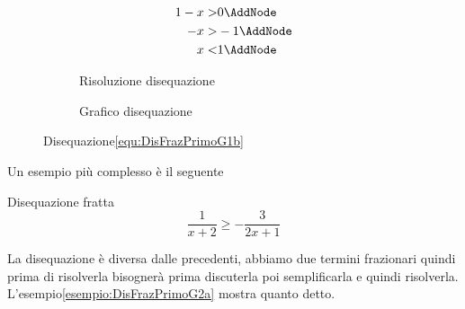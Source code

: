 \begin{figure}
	\centering
	\begin{subfigure}[]{\linewidth}
		\begin{NodesList}
			\centering
			\begin{align*}
				1-x>& 0\AddNode\\
				-x>&-1\AddNode\\
				x<&1\AddNode
			\end{align*}
			\LinkNodes[margin=6cm]{}%
			\LinkNodes[margin=6cm]{}%
		\end{NodesList}
		\caption{Risoluzione disequazione}
		\label{svo:DisFrazPrimoGìb}
	\end{subfigure}%
	\qquad
	\begin{subfigure}[]{\linewidth}
		\centering
		\caption{Grafico disequazione}
		\label{graf:DisFrazPrimoG1b}
	\end{subfigure}%
	\captionsetup{format=esempio,list=no}
	\caption{Disequazione\nobs\vref{equ:DisFrazPrimoG1b}}
	\label{esempio:DisFrazPrimoG1b}
\end{figure}

Un esempio più complesso è il seguente
\begin{esempiot}{Disequazione fratta}{}
\begin{equation}
\dfrac{1}{x+2}\geq-\dfrac{3}{2x+1}\label{equ:DisFrazPrimoG2}
\end{equation}
\end{esempiot}

La disequazione è diversa dalle precedenti, abbiamo due termini frazionari quindi prima di risolverla bisognerà prima discuterla poi semplificarla e quindi  risolverla. L'esempio\nobs\vref{esempio:DisFrazPrimoG2a} mostra quanto detto. 

